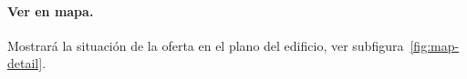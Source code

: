 \paragraph{Ver en mapa.} Mostrará la situación de la oferta en el plano del edificio, ver subfigura~\ref{fig:map-detail}.

\begin{figure}[tbp]
\centering
{}

\end{figure}
